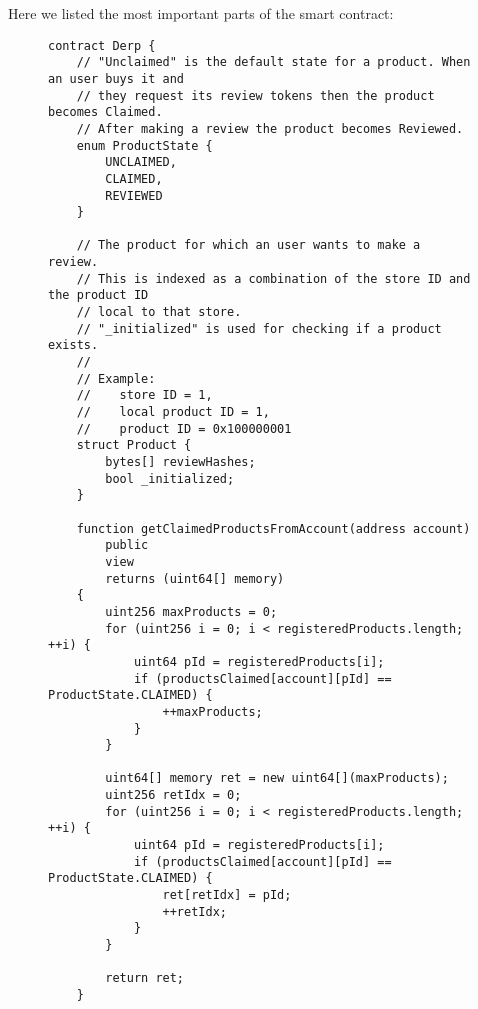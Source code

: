 Here we listed the most important parts of the smart contract:

\begin{figure}[H]
    \begin{verbatim}
contract Derp {
    // "Unclaimed" is the default state for a product. When an user buys it and
    // they request its review tokens then the product becomes Claimed.
    // After making a review the product becomes Reviewed.
    enum ProductState {
        UNCLAIMED,
        CLAIMED,
        REVIEWED
    }

    // The product for which an user wants to make a review.
    // This is indexed as a combination of the store ID and the product ID
    // local to that store.
    // "_initialized" is used for checking if a product exists.
    //
    // Example:
    //    store ID = 1,
    //    local product ID = 1,
    //    product ID = 0x100000001
    struct Product {
        bytes[] reviewHashes;
        bool _initialized;
    }

    function getClaimedProductsFromAccount(address account)
        public
        view
        returns (uint64[] memory)
    {
        uint256 maxProducts = 0;
        for (uint256 i = 0; i < registeredProducts.length; ++i) {
            uint64 pId = registeredProducts[i];
            if (productsClaimed[account][pId] == ProductState.CLAIMED) {
                ++maxProducts;
            }
        }

        uint64[] memory ret = new uint64[](maxProducts);
        uint256 retIdx = 0;
        for (uint256 i = 0; i < registeredProducts.length; ++i) {
            uint64 pId = registeredProducts[i];
            if (productsClaimed[account][pId] == ProductState.CLAIMED) {
                ret[retIdx] = pId;
                ++retIdx;
            }
        }

        return ret;
    }
    \end{verbatim}
    \label{code:sc-structs}
\end{figure}


